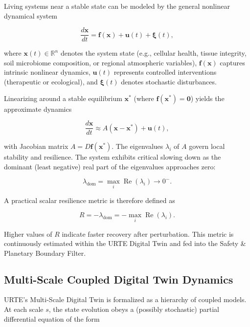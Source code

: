 \documentclass[11pt,a4paper]{article}
\begin{document}
Living systems near a stable state can be modeled by the general nonlinear dynamical system

\begin{equation}
\frac{d\mathbf{x}}{dt} = \mathbf{f}(\mathbf{x}) + \mathbf{u}(t) + \boldsymbol{\xi}(t),
\end{equation}

where $\mathbf{x}(t) \in \mathbb{R}^n$ denotes the system state (e.g., cellular health, tissue integrity, soil microbiome composition, or regional atmospheric variables), $\mathbf{f}(\mathbf{x})$ captures intrinsic nonlinear dynamics, $\mathbf{u}(t)$ represents controlled interventions (therapeutic or ecological), and $\boldsymbol{\xi}(t)$ denotes stochastic disturbances.

Linearizing around a stable equilibrium $\mathbf{x}^*$ (where $\mathbf{f}(\mathbf{x}^*) = \mathbf{0}$) yields the approximate dynamics

\begin{equation}
\frac{d\mathbf{x}}{dt} \approx A(\mathbf{x} - \mathbf{x}^*) + \mathbf{u}(t),
\end{equation}

with Jacobian matrix $A = D\mathbf{f}(\mathbf{x}^*)$. The eigenvalues $\lambda_i$ of $A$ govern local stability and resilience. The system exhibits critical slowing down as the dominant (least negative) real part of the eigenvalues approaches zero:

\begin{equation}
\lambda_{\text{dom}} = \max_i \operatorname{Re}(\lambda_i) \to 0^-.
\end{equation}

A practical scalar resilience metric is therefore defined as

\begin{equation}
R = -\lambda_{\text{dom}} = -\max_i \operatorname{Re}(\lambda_i).
\end{equation}

Higher values of $R$ indicate faster recovery after perturbation. This metric is continuously estimated within the URTE Digital Twin and fed into the Safety \& Planetary Boundary Filter.

\subsection{Multi-Scale Coupled Digital Twin Dynamics}

URTE's Multi-Scale Digital Twin is formalized as a hierarchy of coupled models. At each scale $s$, the state evolution obeys a (possibly stochastic) partial differential equation of the form
\end{document}
